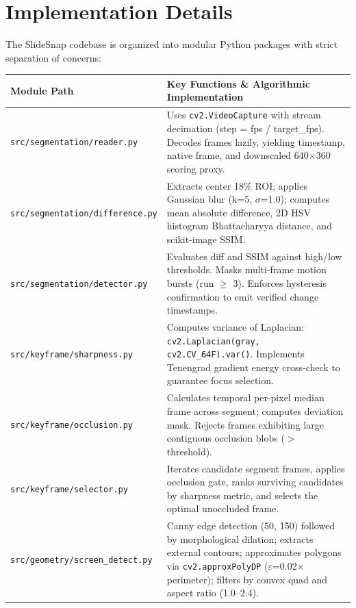 \documentclass[10pt,a4paper]{article}
\begin{document}
\section{Implementation Details}

The SlideSnap codebase is organized into modular Python packages with strict separation of concerns:

\begin{table}[h!]
\small
\centering
\begin{tabularx}{\textwidth}{@{} p{44mm} X @{}}
\toprule
\rowcolor{navy}\color{white}\textbf{Module Path} & \color{white}\textbf{Key Functions \& Algorithmic Implementation} \\
\midrule
\texttt{src/segmentation/reader.py} & Uses \texttt{cv2.VideoCapture} with stream decimation (step = fps / target\_fps). Decodes frames lazily, yielding timestamp, native frame, and downscaled 640$\times$360 scoring proxy. \\
\texttt{src/segmentation/difference.py} & Extracts center 18\% ROI; applies Gaussian blur (k=5, $\sigma$=1.0); computes mean absolute difference, 2D HSV histogram Bhattacharyya distance, and scikit-image SSIM. \\
\texttt{src/segmentation/detector.py} & Evaluates diff and SSIM against high/low thresholds. Masks multi-frame motion bursts (run $\ge$ 3). Enforces hysteresis confirmation to emit verified change timestamps. \\
\texttt{src/keyframe/sharpness.py} & Computes variance of Laplacian: \texttt{cv2.Laplacian(gray, cv2.CV\_64F).var()}. Implements Tenengrad gradient energy cross-check to guarantee focus selection. \\
\texttt{src/keyframe/occlusion.py} & Calculates temporal per-pixel median frame across segment; computes deviation mask. Rejects frames exhibiting large contiguous occlusion blobs ($>$ threshold). \\
\texttt{src/keyframe/selector.py} & Iterates candidate segment frames, applies occlusion gate, ranks surviving candidates by sharpness metric, and selects the optimal unoccluded frame. \\
\texttt{src/geometry/screen\_detect.py} & Canny edge detection (50, 150) followed by morphological dilation; extracts external contours; approximates polygons via \texttt{cv2.approxPolyDP} ($\varepsilon$=0.02$\times$perimeter); filters by convex quad and aspect ratio (1.0–2.4). \\

\end{tabularx}
\end{table}
\end{document}
